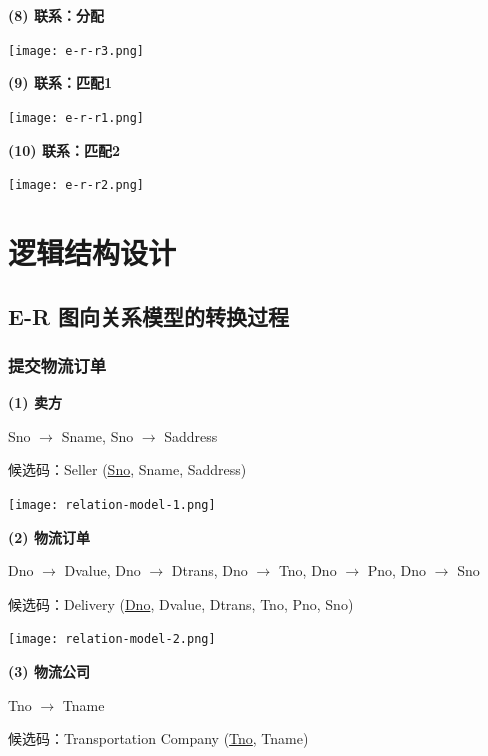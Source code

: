 \documentclass[12pt]{article}
\begin{document}
\noindent \textbf{(8) 联系：分配}

\begin{center}
	\texttt{[image: e-r-r3.png]}
\end{center}

\noindent \textbf{(9) 联系：匹配1}

\begin{center}
	\texttt{[image: e-r-r1.png]}
\end{center}

\noindent \textbf{(10) 联系：匹配2}

\begin{center}
	\texttt{[image: e-r-r2.png]}
\end{center}

\section{逻辑结构设计}

\subsection{E-R 图向关系模型的转换过程}

\subsubsection{提交物流订单}

\noindent \textbf{(1) 卖方} \par 
Sno $\rightarrow$ Sname, Sno $\rightarrow$ Saddress \par 
候选码：Seller (\underline{Sno}, Sname, Saddress) 

\begin{center}
	\texttt{[image: relation-model-1.png]}
\end{center}

\noindent \textbf{(2) 物流订单} \par 
Dno $\rightarrow$ Dvalue, Dno $\rightarrow$ Dtrans, Dno $\rightarrow$ Tno, Dno $\rightarrow$ Pno, Dno $\rightarrow$ Sno \par 
候选码：Delivery (\underline{Dno}, Dvalue, Dtrans, Tno, Pno, Sno)

\begin{center}
	\texttt{[image: relation-model-2.png]}
\end{center}

\noindent \textbf{(3) 物流公司} \par 
Tno $\rightarrow$ Tname \par 
候选码：Transportation Company (\underline{Tno}, Tname)
\end{document}
